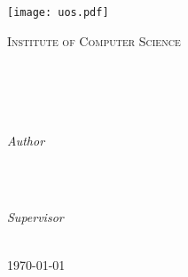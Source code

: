 %
%
%
%
%
%

\begin{titlepage}
	\centering
	\thispagestyle{empty}
	\begin{center}
		\texttt{[image: uos.pdf]}
	\end{center}
	\Large{\textsc{Institute of Computer Science}}
	\vfill
	\textsc{\Large{\emph{\mycourse}}}\\[0.5cm]
	\ifx\status\draft
		\MakeUppercase{\textbf{\textit{\status}}}\\
	\fi
	\HRule\\[0.4cm]
	\vspace{8mm}
	\Large{\textbf{{\selectfont\myMaintitle}}}\\
	\vspace{8mm}
	\HRule\\[0.4cm]
	\vspace{9mm}

	\begin{minipage}{0.4\textwidth}
		\begin{flushleft}
			\large
			\textit{Author}\\
			\textsc{\myName}\\
			\textsc{\myMatrikel}
		\end{flushleft}
	\end{minipage}
	~
	\begin{minipage}{0.4\textwidth}
		\begin{flushright}
			\large
			\textit{Supervisor}\\
			\textsc{\fistSupervisor}\\
			\textsc{\secSupervisor}
		\end{flushright}
	\end{minipage}

	\vspace{5cm}
	\large{\today}
	\vfill
	\end{titlepage}
	\newpage
